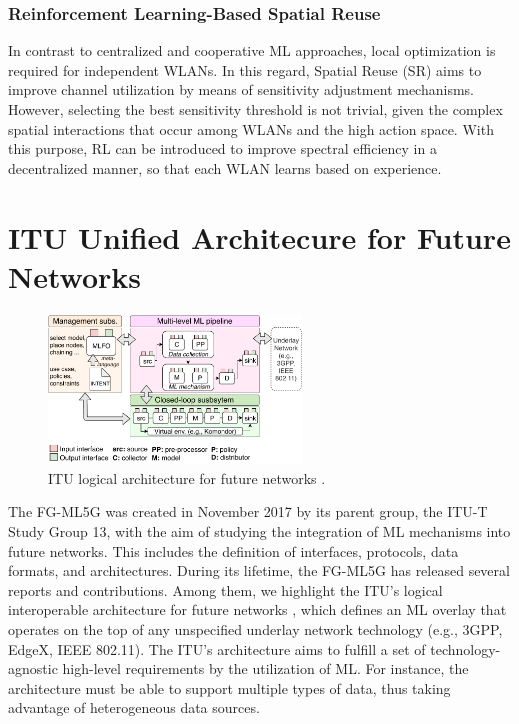 \documentclass[twocolumn]{article}
\begin{document}
\subsubsection{Reinforcement Learning-Based Spatial Reuse} 
In contrast to centralized and cooperative ML approaches, local optimization is required for independent WLANs. In this regard, Spatial Reuse (SR) aims to improve channel utilization by means of sensitivity adjustment mechanisms. However, selecting the best sensitivity threshold is not trivial, given the complex spatial interactions that occur among WLANs and the high action space. With this purpose, RL can be introduced to improve spectral efficiency in a decentralized manner, so that each WLAN learns based on experience.


\section{ITU Unified Architecure for Future Networks}
\label{section:itu_architecture}

\begin{figure}[!ht]
	\centering
	\includegraphics[width=0.6\textwidth]{itu_ml_architecture}
	\caption{ITU logical architecture for future networks \cite{itu2019architecture}.}
	\label{fig:itu_ml_architecture}
\end{figure}

The FG-ML5G was created in November 2017 by its parent group, the ITU-T Study Group 13, with the aim of studying the integration of ML mechanisms into future networks. This includes the definition of interfaces, protocols, data formats, and architectures. During its lifetime, the FG-ML5G has released several reports and contributions. Among them, we highlight the ITU's logical interoperable architecture for future networks \cite{itu2019architecture}, which defines an ML overlay that operates on the top of any unspecified underlay network technology (e.g., 3GPP, EdgeX, IEEE 802.11). The ITU's architecture aims to fulfill a set of technology-agnostic high-level requirements by the utilization of ML. For instance, the architecture must be able to support multiple types of data, thus taking advantage of heterogeneous data sources. 
\end{document}
